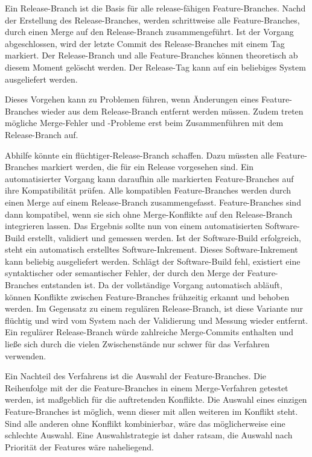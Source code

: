 Ein Release-Branch ist die Basis für alle release-fähigen Feature-Branches. Nachd der Erstellung des Release-Branches, werden schrittweise alle Feature-Branches, durch einen Merge auf den Release-Branch zusammengeführt. Ist der Vorgang abgeschlossen, wird der letzte Commit des Release-Branches mit einem Tag markiert. Der Release-Branch und alle Feature-Branches können theoretisch ab diesem Moment gelöscht werden. Der Release-Tag kann auf ein beliebiges System ausgeliefert werden.

Dieses Vorgehen kann zu Problemen führen, wenn Änderungen eines Feature-Branches wieder aus dem Release-Branch entfernt werden müssen. Zudem treten mögliche Merge\hyp{}Fehler und \hyp{}Probleme erst beim Zusammenführen mit dem Release-Branch auf.

Abhilfe könnte ein \glqq flüchtiger\grqq{}-Release-Branch schaffen. Dazu müssten alle Feature-Branches markiert werden, die für ein Release vorgesehen sind. Ein automatisierter Vorgang kann daraufhin alle markierten Feature-Branches auf ihre Kompatibilität prüfen. Alle kompatiblen Feature-Branches werden durch einen Merge auf einem Release-Branch zusammengefasst. Feature-Branches sind dann kompatibel, wenn sie sich ohne Merge-Konflikte auf den Release-Branch integrieren lassen. Das Ergebnis sollte nun von einem automatisierten Software-Build erstellt, validiert und gemessen werden. Ist der Software-Build erfolgreich, steht ein automatisch erstelltes Software-Inkrement. Dieses Software-Inkrement kann beliebig ausgeliefert werden. Schlägt der Software-Build fehl, existiert eine syntaktischer oder semantischer Fehler, der durch den Merge der Feature-Branches entstanden ist. Da der vollständige Vorgang automatisch abläuft, können Konflikte zwischen Feature-Branches frühzeitig erkannt und behoben werden. Im Gegensatz zu einem regulären Release-Branch, ist diese Variante nur flüchtig und wird vom System nach der Validierung und Messung wieder entfernt. Ein regulärer Release-Branch würde zahlreiche Merge-Commits enthalten und ließe sich durch die vielen Zwischenstände nur schwer für das Verfahren verwenden.

Ein Nachteil des Verfahrens ist die Auswahl der Feature-Branches. Die Reihenfolge mit der die Feature-Branches in einem Merge-Verfahren getestet werden, ist maßgeblich für die auftretenden Konflikte. Die Auswahl eines einzigen Feature-Branches ist möglich, wenn dieser mit allen weiteren im Konflikt steht. Sind alle anderen ohne Konflikt kombinierbar, wäre das möglicherweise eine schlechte Auswahl. Eine Auswahlstrategie ist daher ratsam, die Auswahl nach Priorität der Features wäre naheliegend.

